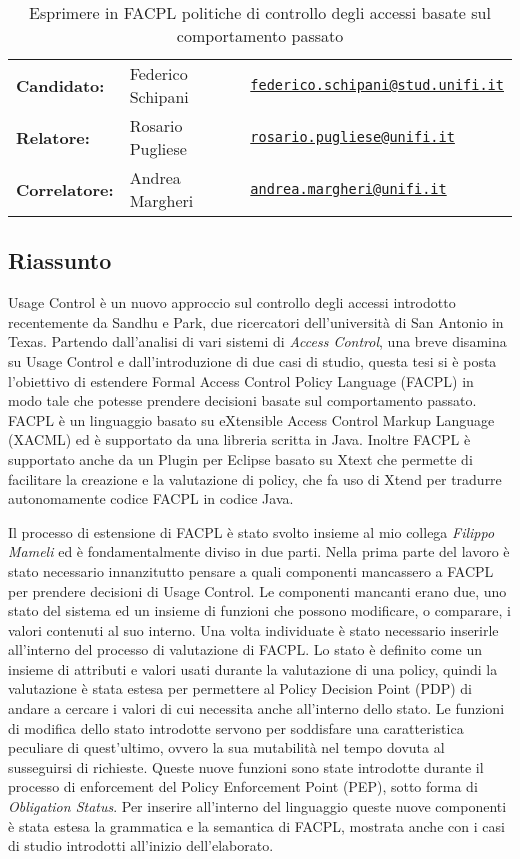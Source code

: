 \documentclass{article}
\begin{document}
\begin{table}[]
\centering
\caption*{Esprimere in FACPL politiche di controllo degli accessi basate sul comportamento passato}
\begin{tabular}{lll}
\textbf{Candidato:}   & Federico Schipani & \href{mailto:federico.schipani@stud.unifi.it}{\texttt{federico.schipani@stud.unifi.it}}  \\
\textbf{Relatore:}    & Rosario Pugliese  & \href{mailto:rosario.pugliese@unifi.it}{\texttt{rosario.pugliese@unifi.it}}                           \\
\textbf{Correlatore:} & Andrea Margheri   & \href{mailto:andrea.margheri@unifi.it}{\texttt{andrea.margheri@unifi.it}}                          
\end{tabular}
\end{table}
\subsection*{Riassunto}
Usage Control è un nuovo approccio sul controllo degli accessi introdotto recentemente da Sandhu e Park, due ricercatori dell'università di San Antonio in Texas.
Partendo dall'analisi di vari sistemi di \textit{Access Control}, una breve disamina su Usage Control e dall'introduzione di due casi di studio, questa tesi si è posta l'obiettivo di estendere Formal Access Control Policy Language (FACPL) in modo tale che potesse prendere decisioni basate sul comportamento passato. FACPL è un linguaggio basato su eXtensible Access Control Markup Language (XACML) ed è supportato da una libreria scritta in Java. Inoltre FACPL è supportato anche da un Plugin per Eclipse basato su Xtext che permette di facilitare la creazione e la valutazione di policy, che fa uso di Xtend per tradurre autonomamente codice FACPL in codice Java. \par
Il processo di estensione di FACPL è stato svolto insieme al mio collega \textit{Filippo Mameli} ed è fondamentalmente diviso in due parti.
Nella prima parte del lavoro è stato necessario innanzitutto pensare a quali componenti mancassero a FACPL per prendere decisioni di Usage Control. Le componenti mancanti erano due, uno stato del sistema ed un insieme di funzioni che possono modificare, o comparare, i valori contenuti al suo interno. Una volta individuate è stato necessario inserirle all'interno del processo di valutazione di FACPL. Lo stato è definito come un insieme di attributi e valori usati durante la valutazione di una policy, quindi la valutazione è stata estesa per permettere al Policy Decision Point (PDP) di andare a cercare i valori di cui necessita anche all'interno dello stato. Le funzioni di modifica dello stato introdotte servono per soddisfare una caratteristica peculiare di quest'ultimo, ovvero la sua mutabilità nel tempo dovuta al susseguirsi di richieste. Queste nuove funzioni sono state introdotte durante il processo di enforcement del Policy Enforcement Point (PEP), sotto forma di \textit{Obligation Status}. Per inserire all'interno del linguaggio queste nuove componenti è stata estesa la grammatica e la semantica di FACPL, mostrata anche con i casi di studio introdotti all'inizio dell'elaborato.\par
\end{document}
